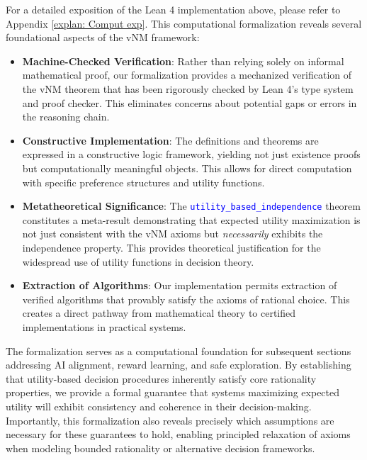 \documentclass{article}
\theoremstyle{definition}
\newcommand{\tactic}[1]{\textcolor{blue}{\texttt{#1}}}
\begin{document}
For a detailed exposition of the Lean 4 implementation above, please refer to Appendix \ref{explan: Comput exp}. This computational formalization reveals several foundational aspects of the vNM framework:

\begin{itemize}
  \item \textbf{Machine-Checked Verification}: Rather than relying solely on informal mathematical proof, our formalization provides a mechanized verification of the vNM theorem that has been rigorously checked by Lean 4's type system and proof checker. This eliminates concerns about potential gaps or errors in the reasoning chain.

  \item \textbf{Constructive Implementation}: The definitions and theorems are expressed in a constructive logic framework, yielding not just existence proofs but computationally meaningful objects. This allows for direct computation with specific preference structures and utility functions.

  \item \textbf{Metatheoretical Significance}: The \tactic{utility\_based\_independence} theorem constitutes a meta-result demonstrating that expected utility maximization is not just consistent with the vNM axioms but \textit{necessarily} exhibits the independence property. This provides theoretical justification for the widespread use of utility functions in decision theory.

  \item \textbf{Extraction of Algorithms}: Our implementation permits extraction of verified algorithms that provably satisfy the axioms of rational choice. This creates a direct pathway from mathematical theory to certified implementations in practical systems.
\end{itemize}

The formalization serves as a computational foundation for subsequent sections addressing AI alignment, reward learning, and safe exploration. By establishing that utility-based decision procedures inherently satisfy core rationality properties, we provide a formal guarantee that systems maximizing expected utility will exhibit consistency and coherence in their decision-making. Importantly, this formalization also reveals precisely which assumptions are necessary for these guarantees to hold, enabling principled relaxation of axioms when modeling bounded rationality or alternative decision frameworks.
\end{document}
